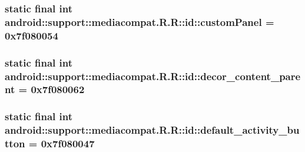 \hypertarget{classandroid_1_1support_1_1mediacompat_1_1_r_1_1id_3e5299a3b321c233d31e9ac406d0af46}{
\subsubsection[{customPanel}]{\setlength{\rightskip}{0pt plus 5cm}static final int android::support::mediacompat.R.R::id::customPanel = 0x7f080054}}
\label{classandroid_1_1support_1_1mediacompat_1_1_r_1_1id_3e5299a3b321c233d31e9ac406d0af46}


\hypertarget{classandroid_1_1support_1_1mediacompat_1_1_r_1_1id_b8911386d31a228c72ce171bc3f7b430}{
\subsubsection[{decor\_\-content\_\-parent}]{\setlength{\rightskip}{0pt plus 5cm}static final int android::support::mediacompat.R.R::id::decor\_\-content\_\-parent = 0x7f080062}}
\label{classandroid_1_1support_1_1mediacompat_1_1_r_1_1id_b8911386d31a228c72ce171bc3f7b430}


\hypertarget{classandroid_1_1support_1_1mediacompat_1_1_r_1_1id_10ff438502eb16ccf473984dbe3a3e2a}{
\subsubsection[{default\_\-activity\_\-button}]{\setlength{\rightskip}{0pt plus 5cm}static final int android::support::mediacompat.R.R::id::default\_\-activity\_\-button = 0x7f080047}}
\label{classandroid_1_1support_1_1mediacompat_1_1_r_1_1id_10ff438502eb16ccf473984dbe3a3e2a}


